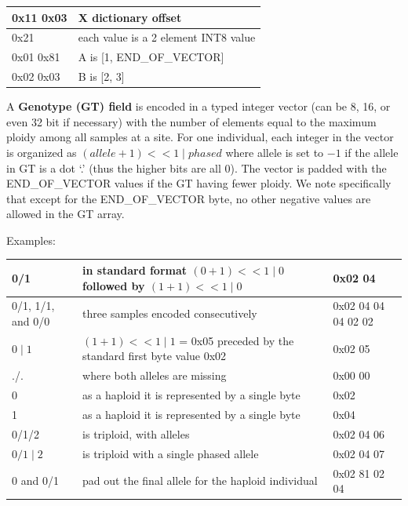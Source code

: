 \documentclass[8pt]{article}
\begin{document}
\vspace{0.3cm}
\begin{tabular}{|p{2cm} | l |} \hline
0x11 0x03 & X dictionary offset \\ \hline
0x21 & each value is a 2 element INT8 value \\ \hline
0x01 0x81 & A is [1, END\_OF\_VECTOR] \\ \hline
0x02 0x03 & B is [2, 3] \\ \hline
\end{tabular}
\vspace{0.3cm}


\vspace{0.3cm}
A \textbf{Genotype (GT) field} is encoded in a typed integer vector (can be 8, 16, or even 32 bit if necessary) with the number of elements equal to the maximum ploidy among all samples at a site.
For one individual, each integer in the vector is organized as $(allele+1) << 1 \mid phased$ where allele is set to $-1$ if the allele in GT is a dot `.' (thus the higher bits are all 0).
The vector is padded with the END\_OF\_VECTOR values if the GT having fewer ploidy.
We note specifically that except for the END\_OF\_VECTOR byte, no other negative values are allowed in the GT array.

Examples:

\vspace{0.3cm}
\small
\begin{tabular}{|p{2.5cm} | p{10cm} | p{3cm}|} \hline
0/1 & in standard format $(0 + 1) << 1 \mid 0$ followed by $(1 + 1) << 1 \mid 0$ & 0x02 04 \\ \hline
0/1, 1/1, and 0/0 & three samples encoded consecutively & 0x02 04 04 04 02 02 \\ \hline
$0\mid1$ & $(1 + 1) << 1 \mid 1$ = 0x05 preceded by the standard first byte value 0x02 & 0x02 05 \\ \hline
./. & where both alleles are missing & 0x00 00 \\ \hline
0 & as a haploid it is represented by a single byte & 0x02 \\ \hline
1 & as a haploid it is represented by a single byte & 0x04 \\ \hline
0/1/2 & is triploid, with alleles & 0x02 04 06 \\ \hline
$0/1\mid2$ & is triploid with a single phased allele & 0x02 04 07 \\ \hline
0 and 0/1 & pad out the final allele for the haploid individual & 0x02 81 02 04\\ \hline
\end{tabular}
\normalsize
\end{document}
